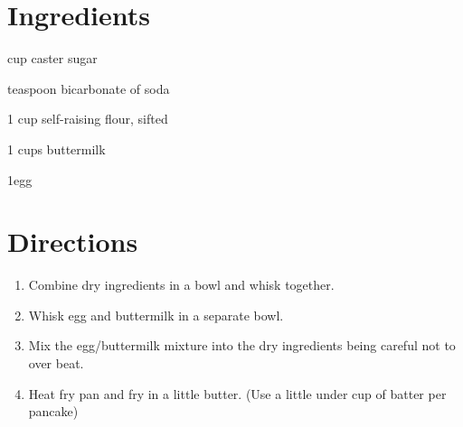 
\section*{Ingredients}
\begin{ingredients-list}
	\item {} cup caster sugar
	\item {} teaspoon bicarbonate of soda
	\item 1 cup self-raising flour, sifted
	\item 1   cups buttermilk
	\item 1egg
\end{ingredients-list}

\section*{Directions}
\begin{enumerate}	
	\item Combine dry ingredients in a bowl and whisk together.
	\item Whisk egg and buttermilk in a separate bowl.
	\item Mix the egg/buttermilk mixture into the dry ingredients being careful not to over beat.
	\item Heat fry pan and fry in a little butter. (Use a little under  cup of batter per pancake)
\end{enumerate}
